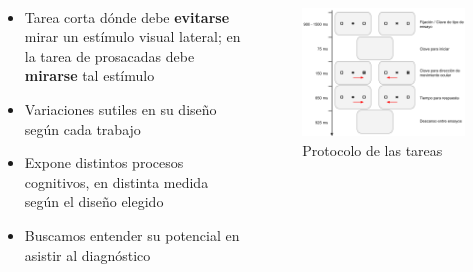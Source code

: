 \documentclass[aspectratio=169]{beamer}
\begin{document}
\begin{frame}{~}

  \begin{columns}
  \begin{column}{.5\textwidth}
    \begin{itemize}
      \item Tarea corta dónde debe \textbf{evitarse} mirar un estímulo visual
        lateral; en la tarea de prosacadas debe \textbf{mirarse} tal estímulo

      \item Variaciones sutiles en su diseño según cada trabajo

      \item Expone distintos procesos cognitivos, en distinta medida según el diseño elegido

      \item Buscamos entender su potencial en asistir al diagnóstico
    \end{itemize}
  \end{column}
  \begin{column}{.5\textwidth}
    \begin{figure}
      \centering
      \includegraphics[width=\linewidth]{img/antisaccades-protocol.png}
      \caption{Protocolo de las tareas}
    \end{figure}
  \end{column}
  \end{columns}

\end{frame}
\end{document}
